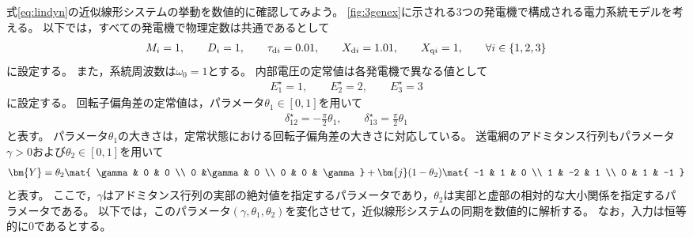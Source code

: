 \documentclass[tombow,dvipdfmx]{corona-a5}
\begin{document}
\begin{例}[近似線形システムの同期に関する数値実験]\label{ex:linsyssim}
式\ref{eq:lindyn}の近似線形システムの挙動を数値的に確認してみよう。
\ref{fig:3genex}に示される3つの発電機で構成される電力系統モデルを考える。
以下では，すべての発電機で物理定数は共通であるとして
\begin{align*}
M_i=1
,\qquad
D_i=1
,\qquad
\tau_{{\rm d}i} = 0.01
,\qquad
X_{{\rm d}i} = 1.01
,\qquad
X_{{\rm q}i} = 1
,\qquad
\forall i \in \{1,2,3\}
\end{align*}
に設定する。
また，系統周波数は$\omega_0=1$とする。
内部電圧の定常値は各発電機で異なる値として
\begin{align*}
E^{\star}_1=1
,\qquad
E^{\star}_2=2
,\qquad
E^{\star}_3=3
\end{align*}
に設定する。
回転子偏角差の定常値は，パラメータ$\theta_1 \in [0, 1]$を用いて
\begin{align*}
\delta_{12}^{\star}= - \frac{\pi}{2} \theta_1
,\qquad
\delta_{13}^{\star}=  \frac{\pi}{2} \theta_1
\end{align*}
と表す。
パラメータ$\theta_1$の大きさは，定常状態における回転子偏角差の大きさに対応している。
送電網のアドミタンス行列もパラメータ$\gamma >0$および$\theta_2 \in [0,1]$を用いて
\begin{align*}
\bm{Y} =
\theta_2
\mat{
\gamma & 0 & 0 \\
0 &\gamma & 0 \\
0 & 0 & \gamma
}
 +
\bm{j} (1-\theta_2) 
\mat{
-1 & 1 & 0 \\
1 & -2 & 1 \\
0 & 1 & -1 
}
\end{align*}
と表す。
ここで，$\gamma$はアドミタンス行列の実部の絶対値を指定するパラメータであり，$\theta_2$は実部と虚部の相対的な大小関係を指定するパラメータである。
以下では，このパラメータ$(\gamma,\theta_1,\theta_2)$を変化させて，近似線形システムの同期を数値的に解析する。
なお，入力は恒等的に0であるとする。


\end{例}
\end{document}
